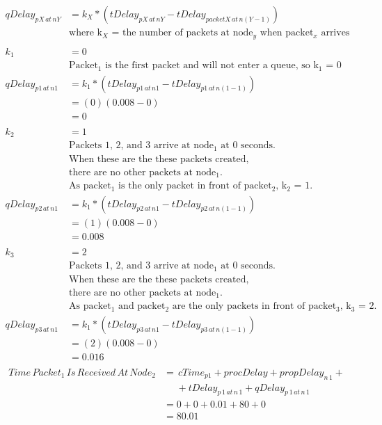 \documentclass[fleqn,11pt]{article}
\begin{document}
\begin{align*}
qDelay_{pX\,at\,nY} &= k_{X}*(tDelay_{pX\,at\,nY} - tDelay_{packetX\,at\,n(Y-1)}) \\
&\text{where k$_X$ = the number of packets at node$_y$ when packet$_x$ arrives}\\
\\
k_{1} &= 0\\
&\text{Packet$_1$ is the first packet and will not enter a queue, so k$_1$ = 0} \\
qDelay_{p1\,at\,n1} &= k_{1}*(tDelay_{p1\,at\,n1} - tDelay_{p1\,at\,n(1-1)})\\
&= (0) (0.008 - 0) \\
&= 0 \\
\\
k_{2} &= 1\\
&\text{Packets 1, 2, and 3 arrive at node$_1$ at 0 seconds.}\\
&\text{When these are the these packets created,}\\
&\text{there are no other packets at node$_1$.}\\
&\text{As packet$_1$ is the only packet in front of packet$_2$, k$_2$ = 1.} \\
qDelay_{p2\,at\,n1} &= k_{1}*(tDelay_{p2\,at\,n1} - tDelay_{p2\,at\,n(1-1)})\\
&= (1) (0.008 - 0) \\
&= 0.008 \\
\\
k_{3} &= 2\\
&\text{Packets 1, 2, and 3 arrive at node$_1$ at 0 seconds.}\\
&\text{When these are the these packets created,}\\
&\text{there are no other packets at node$_1$.}\\
&\text{As packet$_1$ and packet$_2$ are the only packets in front of packet$_3$, k$_3$ = 2.} \\
qDelay_{p3\,at\,n1} &= k_{1}*(tDelay_{p3\,at\,n1} - tDelay_{p3\,at\,n(1-1)})\\
&= (2) (0.008 - 0) \\
&= 0.016 \\
\end{align*}
\begin{align*}
Time\,Packet_{1}\,Is\,Received\,At\,Node_{2} &= \,cTime_{p1} + procDelay + propDelay_{n\,1} +\\
&\,\,\,\,\,\,\,\, + tDelay_{p\,1\,at\,n\,1} + qDelay_{p\,1\,at\,n\,1} \\
&= 0 + 0 + 0.01 + 80 + 0 \\
&= 80.01 
\end{align*}
\end{document}
